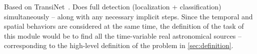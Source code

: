 Based on TransiNet~\cite{transinet}. Does full detection (localization + classification) simultaneously -- along with any necessary implicit steps.
Since the temporal and spatial behaviors are considered at the same time, the definition of the task of this module would be to find all the time-variable real astronomical sources -- corresponding to the high-level definition of the problem in \ref{sec:definition}.















